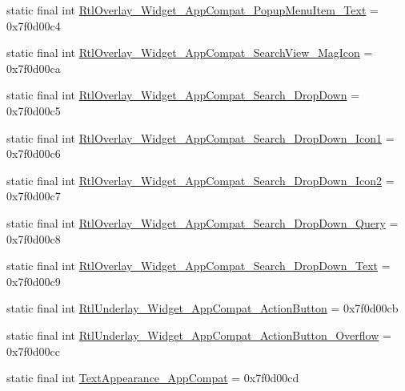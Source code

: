 \begin{DoxyCompactItemize}
\item 
static final int \mbox{\hyperlink{classcom_1_1google_1_1android_1_1gms_1_1R_1_1style_a1d587e7c1f970bf5e88b1c080b9bf417}{Rtl\+Overlay\+\_\+\+Widget\+\_\+\+App\+Compat\+\_\+\+Popup\+Menu\+Item\+\_\+\+Text}} = 0x7f0d00c4
\item 
static final int \mbox{\hyperlink{classcom_1_1google_1_1android_1_1gms_1_1R_1_1style_a45d765b5c016f2014cc965dd5215ea8d}{Rtl\+Overlay\+\_\+\+Widget\+\_\+\+App\+Compat\+\_\+\+Search\+View\+\_\+\+Mag\+Icon}} = 0x7f0d00ca
\item 
static final int \mbox{\hyperlink{classcom_1_1google_1_1android_1_1gms_1_1R_1_1style_ade3b4fd0f0614d47740874e405c516b6}{Rtl\+Overlay\+\_\+\+Widget\+\_\+\+App\+Compat\+\_\+\+Search\+\_\+\+Drop\+Down}} = 0x7f0d00c5
\item 
static final int \mbox{\hyperlink{classcom_1_1google_1_1android_1_1gms_1_1R_1_1style_a69e580ea4b44d94e3dc7f98ce09d03bc}{Rtl\+Overlay\+\_\+\+Widget\+\_\+\+App\+Compat\+\_\+\+Search\+\_\+\+Drop\+Down\+\_\+\+Icon1}} = 0x7f0d00c6
\item 
static final int \mbox{\hyperlink{classcom_1_1google_1_1android_1_1gms_1_1R_1_1style_ae8cca5821afb71ba0140a5c105344833}{Rtl\+Overlay\+\_\+\+Widget\+\_\+\+App\+Compat\+\_\+\+Search\+\_\+\+Drop\+Down\+\_\+\+Icon2}} = 0x7f0d00c7
\item 
static final int \mbox{\hyperlink{classcom_1_1google_1_1android_1_1gms_1_1R_1_1style_a20343e2cb5c5a2a64f397c3ab6b1e9df}{Rtl\+Overlay\+\_\+\+Widget\+\_\+\+App\+Compat\+\_\+\+Search\+\_\+\+Drop\+Down\+\_\+\+Query}} = 0x7f0d00c8
\item 
static final int \mbox{\hyperlink{classcom_1_1google_1_1android_1_1gms_1_1R_1_1style_ae8fda78c6b70f79124cc88755f2d5f88}{Rtl\+Overlay\+\_\+\+Widget\+\_\+\+App\+Compat\+\_\+\+Search\+\_\+\+Drop\+Down\+\_\+\+Text}} = 0x7f0d00c9
\item 
static final int \mbox{\hyperlink{classcom_1_1google_1_1android_1_1gms_1_1R_1_1style_ad14ded657918a971e209af02a0045b56}{Rtl\+Underlay\+\_\+\+Widget\+\_\+\+App\+Compat\+\_\+\+Action\+Button}} = 0x7f0d00cb
\item 
static final int \mbox{\hyperlink{classcom_1_1google_1_1android_1_1gms_1_1R_1_1style_acde92f7f4d01c0cb853b7418a9d39965}{Rtl\+Underlay\+\_\+\+Widget\+\_\+\+App\+Compat\+\_\+\+Action\+Button\+\_\+\+Overflow}} = 0x7f0d00cc
\item 
static final int \mbox{\hyperlink{classcom_1_1google_1_1android_1_1gms_1_1R_1_1style_aeccee9bbd1678fdfc156ba75f2a601ef}{Text\+Appearance\+\_\+\+App\+Compat}} = 0x7f0d00cd

\end{DoxyCompactItemize}
